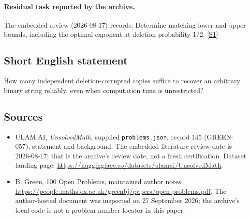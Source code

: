 \documentclass[11pt,a4paper]{article}
\newcommand{\sref}[2]{\hyperlink{source:#1:#2}{[S#2]}}
\begin{document}
\paragraph{Residual task reported by the archive.}

The embedded review (2026-08-17) records: Determine matching lower and upper bounds, including the optimal exponent at deletion probability 1/2. \sref{145}{1}

\subsection{Short English statement}

How many independent deletion-corrupted copies suffice to recover an arbitrary binary string reliably, even when computation time is unrestricted?

\subsection{Sources}

{\small

\begin{itemize}

\item[\hypertarget{source:145:1}{S1}] ULAM.AI, \emph{UnsolvedMath}, supplied \texttt{problems.json}, record 145 (GREEN-057), statement and background. The embedded literature-review date is 2026-08-17; that is the archive’s review date, not a fresh certification. Dataset landing page: \url{https://huggingface.co/datasets/ulamai/UnsolvedMath}.

\item[\hypertarget{source:145:2}{S2}] B. Green, 100 Open Problems, maintained author notes. \url{https://people.maths.ox.ac.uk/greenbj/papers/open-problems.pdf}. The author-hosted document was inspected on 27 September 2026; the archive’s local code is not a problem-number locator in this paper.

\end{itemize}

}

\label{end:145}
\end{document}
